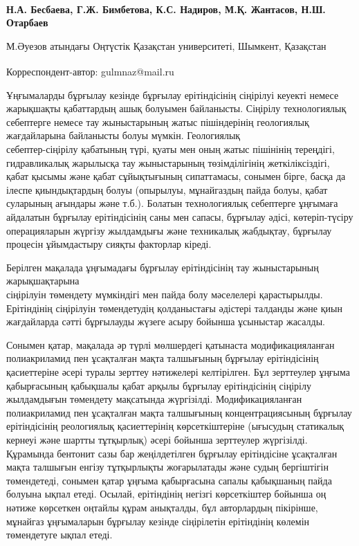 
\begin{articleheader}

{\bfseries
Н.А. Бесбаева,
Г.Ж. Бимбетова\textsuperscript{\envelope },
К.С. Надиров,
М.Қ. Жантасов,
Н.Ш. Отарбаев
}
\end{articleheader}

\begin{affiliation}
М.Әуезов атындағы Оңтүстік Қазақстан университеті, Шымкент, Қазақстан

\raggedright \textsuperscript{\envelope } Корреспондент-автор: gulmnaz@mail.ru
\end{affiliation}

Ұңғымаларды бұрғылау кезінде бұрғылау ерітіндісінің сіңірілуі кеуекті
немесе жарықшақты қабаттардың ашық болуымен байланысты. Сіңірілу
технологиялық себептерге немесе тау жыныстарының жатыс пішіндерінің
геологиялық жағдайларына байланысты болуы мүмкін. Геологиялық\\
себептер-сіңірілу қабатының түрі, қуаты мен оның жатыс пішінінің
тереңдігі, гидравликалық жарылысқа тау жыныстарының төзімділігінің
жеткіліксіздігі, қабат қысымы және қабат сұйықтығының сипаттамасы,
сонымен бірге, басқа да ілеспе қиындықтардың болуы (опырылуы,
мұнайгаздың пайда болуы, қабат суларының ағындары және т.б.). Болатын
технологиялық себептерге ұңғымаға айдалатын бұрғылау ерітіндісінің саны
мен сапасы, бұрғылау әдісі, көтеріп-түсіру операцияларын жүргізу
жылдамдығы және техникалық жабдықтау, бұрғылау процесін ұйымдастыру
сияқты факторлар кіреді.

Берілген мақалада ұңғымадағы бұрғылау ерітіндісінің тау жыныстарының
жарықшақтарына \\сіңірілуін төмендету мүмкіндігі мен пайда болу мәселелері
қарастырылды. Ерітіндінің сіңірілуін төмендетудің қолданыстағы әдістері
талданды және қиын жағдайларда сәтті бұрғылауды жүзеге асыру бойынша
ұсыныстар жасалды.

Сонымен қатар, мақалада әр түрлі мөлшердегі қатынаста модификацияланған
полиакриламид пен ұсақталған мақта талшығының бұрғылау ерітіндісінің
қасиеттеріне әсері туралы зерттеу нәтижелері келтірілген. Бұл зерттеулер
ұңғыма қабырғасының қабықшалы қабат арқылы бұрғылау ерітіндісінің
сіңірілу жылдамдығын төмендету мақсатында жүргізілді. Модификацияланған
полиакриламид пен ұсақталған мақта талшығының концентрациясының бұрғылау
ерітіндісінің реологиялық қасиеттерінің көрсеткіштеріне (ығысудың
статикалық кернеуі және шартты тұтқырлық) әсері бойынша зерттеулер
жүргізілді. Құрамында бентонит сазы бар жеңілдетілген бұрғылау
ерітіндісіне ұсақталған мақта талшығын енгізу тұтқырлықты жоғарылатады
және судың бергіштігін төмендетеді, сонымен қатар ұңғыма қабырғасына
сапалы қабықшаның пайда болуына ықпал етеді. Осылай, ерітіндінің негізгі
көрсеткіштер бойынша оң нәтиже көрсеткен оңтайлы құрам анықталды, бұл
авторлардың пікірінше, мұнайгаз ұңғымаларын бұрғылау кезінде сіңірілетін
ерітіндінің көлемін төмендетуге ықпал етеді.

